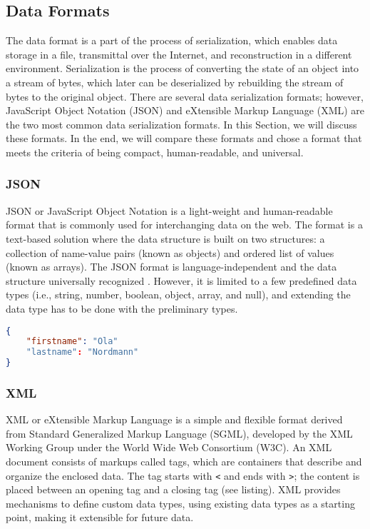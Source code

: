 \subsection{Data Formats}

The data format is a part of the process of serialization, which enables data storage in a file, transmittal over the Internet, and reconstruction in a different environment. Serialization is the process of converting the state of an object into a stream of bytes, which later can be deserialized by rebuilding the stream of bytes to the original object. There are several data serialization formats; however, JavaScript Object Notation (JSON) and eXtensible Markup Language (XML) are the two most common data serialization formats. In this Section, we will discuss these formats. In the end, we will compare these formats and chose a format that meets the criteria of being compact, human-readable, and universal. 

\subsubsection{JSON}
JSON or JavaScript Object Notation is a light-weight and human-readable format that is commonly used for interchanging data on the web. The format is a text-based solution where the data structure is built on two structures: a collection of name-value pairs (known as objects) and ordered list of values (known as arrays). The JSON format is language-independent and the data structure universally recognized \cite{jsonorg, jsonvxml}. However, it is limited to a few predefined data types (i.e., string, number, boolean, object, array, and null), and extending the data type has to be done with the preliminary types. 

\begin{lstlisting}[language=json, caption={My Caption}, captionpos=b]
{
    "firstname": "Ola"
    "lastname": "Nordmann"
}
\end{lstlisting}

\subsubsection{XML}
XML or eXtensible Markup Language is a simple and flexible format derived from Standard Generalized Markup Language (SGML), developed by the XML Working Group under the World Wide Web Consortium (W3C). An XML document consists of markups called tags, which are containers that describe and organize the enclosed data. The tag starts with \verb|<| and ends with \verb|>|; the content is placed between an opening tag and a closing tag (see listing). \cite{w3xml, jsonvxml} XML provides mechanisms to define custom data types, using existing data types as a starting point, making it extensible for future data. 

